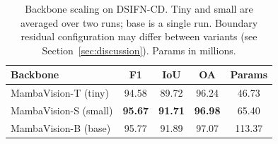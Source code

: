 \begin{table}[t]
\centering
\caption{Backbone scaling on DSIFN-CD. Tiny and small are averaged over two runs; base is a single run. Boundary residual configuration may differ between variants (see Section~\ref{sec:discussion}). Params in millions.}
\label{tab:scaling}
\begin{tabular}{lcccc}
\toprule
Backbone & F1 & IoU & OA & Params \\
\midrule
MambaVision-T (tiny)  & 94.58 & 89.72 & 96.24 &  46.73 \\
MambaVision-S (small) & \textbf{95.67} & \textbf{91.71} & \textbf{96.98} &  65.40 \\
MambaVision-B (base)  & 95.77 & 91.89 & 97.07 & 113.37 \\
\bottomrule
\end{tabular}
\end{table}
